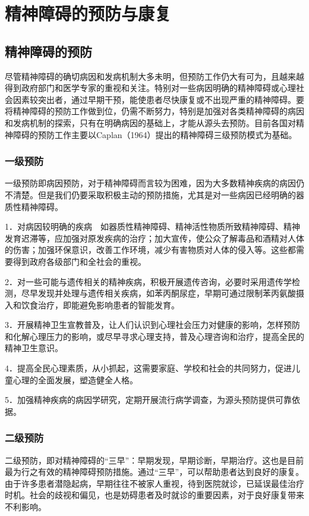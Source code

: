 \chapter{精神障碍的预防与康复}

\section{精神障碍的预防}

尽管精神障碍的确切病因和发病机制大多未明，但预防工作仍大有可为，且越来越得到政府部门和医学专家的重视和关注。特别对一些病因明确的精神障碍或心理社会因素较突出者，通过早期干预，能使患者尽快康复或不出现严重的精神障碍。要将精神障碍的预防工作做到位，仍需不断努力，特别是加强对各类精神障碍的病因和发病机制的探索，只有在明确病因的基础上，才能从源头去预防。目前各国对精神障碍的预防工作主要以Caplan（1964）提出的精神障碍三级预防模式为基础。

\subsection{一级预防}

一级预防即病因预防，对于精神障碍而言较为困难，因为大多数精神疾病的病因仍不清楚。但是我们仍要采取积极主动的预防措施，尤其是对一些病因已经明确的器质性精神障碍。

1．对病因较明确的疾病　如器质性精神障碍、精神活性物质所致精神障碍、精神发育迟滞等，应加强对原发疾病的治疗；加大宣传，使公众了解毒品和酒精对人体的伤害；加强环保意识，改善工作环境，减少有害物质对人体的侵入等。这些都需要得到政府各级部门和全社会的重视。

2．对一些可能与遗传相关的精神疾病，积极开展遗传咨询，必要时采用遗传学检测，尽早发现并处理与遗传相关疾病，如苯丙酮尿症，早期可通过限制苯丙氨酸摄入和饮食治疗，即能避免影响患者的智能发育。

3．开展精神卫生宣教普及，让人们认识到心理社会压力对健康的影响，怎样预防和化解心理压力的影响，或尽早寻求心理支持，普及心理咨询和治疗，提高全民的精神卫生意识。

4．提高全民心理素质，从小抓起，这需要家庭、学校和社会的共同努力，促进儿童心理的全面发展，塑造健全人格。

5．加强精神疾病的病因学研究，定期开展流行病学调查，为源头预防提供可靠依据。

\subsection{二级预防}

二级预防，即对精神障碍的“三早”：早期发现，早期诊断，早期治疗。这也是目前最为行之有效的精神障碍预防措施。通过“三早”，可以帮助患者达到良好的康复。由于许多患者潜隐起病，早期往往不被家人重视，待到医院就诊，已延误最佳治疗时机。社会的歧视和偏见，也是妨碍患者及时就诊的重要因素，对于良好康复带来不利影响。

